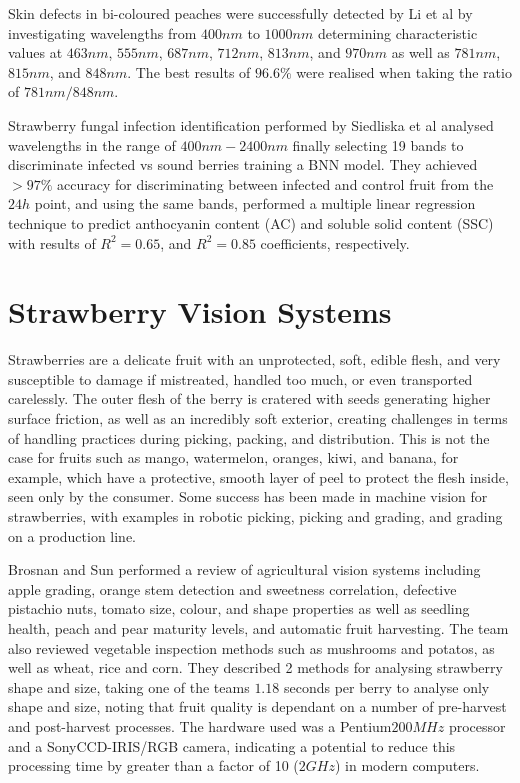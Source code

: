 \documentclass[fleqn,twoside,12pt]{report}
\begin{document}
Skin defects in bi-coloured peaches were successfully detected by Li et al \cite{li2} by investigating wavelengths from $400nm$ to $1000nm$ determining characteristic values at $463nm$, $555nm$, $687nm$, $712nm$, $813nm$, and $970nm$ as well as $781nm$, $815nm$, and $848nm$. The best results of $96.6\%$ were realised when taking the ratio of $781nm/848nm$.

Strawberry fungal infection identification performed by Siedliska et al \cite{siedliska} analysed wavelengths in the range of $400nm-2400nm$ finally selecting 19 bands to discriminate infected vs sound berries training a BNN model. They achieved $>97\%$ accuracy for discriminating between infected and control fruit from the $24h$ point, and using the same bands, performed a multiple linear regression technique to predict anthocyanin content (AC) and soluble solid content (SSC) with results of $R^2=0.65$, and $R^2=0.85$ coefficients, respectively.





\section{Strawberry Vision Systems}

Strawberries are a delicate fruit with an unprotected, soft, edible flesh, and very susceptible to damage if mistreated, handled too much, or even transported carelessly. The outer flesh of the berry is cratered with seeds generating higher surface friction, as well as an incredibly soft exterior, creating challenges in terms of handling practices during picking, packing, and distribution. This is not the case for fruits such as mango, watermelon, oranges, kiwi, and banana, for example, which have a protective, smooth layer of peel to protect the flesh inside, seen only by the consumer. Some success has been made in machine vision for strawberries, with examples in robotic picking, picking and grading, and grading on a production line. 

Brosnan and Sun \cite{brosnan} performed a review of agricultural vision systems including apple grading, orange stem detection and sweetness correlation, defective pistachio nuts, tomato size, colour, and shape properties as well as seedling health, peach and pear maturity levels, and automatic fruit harvesting. The team also reviewed vegetable inspection methods such as mushrooms and potatos, as well as wheat, rice and corn. They described 2 methods for analysing strawberry shape and size, taking one of the teams $1.18$ seconds per berry to analyse only shape and size, noting that fruit quality is dependant on a number of pre-harvest and post-harvest processes. The hardware used was a Pentium\textregistered $200MHz$ processor and a Sony\textregistered CCD-IRIS/RGB camera, indicating a potential to reduce this processing time by greater than a factor of 10 ($2GHz$) in modern computers.
\end{document}

